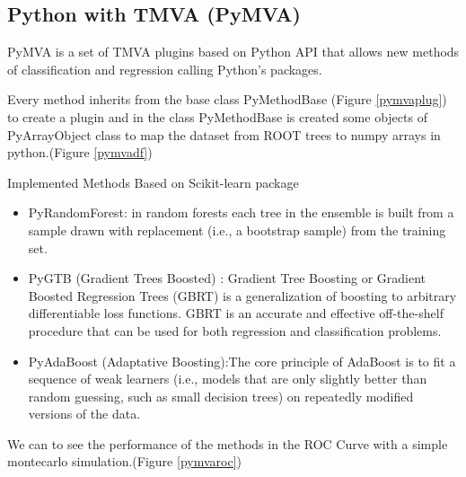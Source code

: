\documentclass[a4paper]{jpconf}
\begin{document}
\clearpage
\subsection{Python with TMVA (PyMVA)} \label{PYMVA}
PyMVA is a set of TMVA plugins based on Python API that
allows new methods of classification and regression calling
Python's packages.

Every method inherits from the base class PyMethodBase (Figure \ref{pymvaplug})
to create a plugin and in the class PyMethodBase is created some objects of PyArrayObject class to map
the dataset from ROOT trees to numpy arrays in python.(Figure \ref{pymvadf}) 

Implemented Methods Based on Scikit-learn package
\begin{itemize}
\item PyRandomForest: in random forests each tree in the ensemble is built from a sample drawn with replacement (i.e., a bootstrap sample) from the training set.
\item PyGTB (Gradient Trees Boosted) : Gradient Tree Boosting or Gradient Boosted Regression Trees (GBRT) is a generalization of boosting to arbitrary differentiable loss
functions. GBRT is an accurate and effective off-the-shelf procedure that can be used for both regression and classification problems.
\item PyAdaBoost (Adaptative Boosting):The core principle of AdaBoost is to fit a sequence of weak learners (i.e., models that are only slightly better than random guessing, such as small
decision trees) on repeatedly modified versions of the data. 
\end{itemize}

We can to see the performance of the methods in the ROC Curve with a simple montecarlo simulation.(Figure \ref{pymvaroc})
\end{document}
